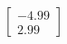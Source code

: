 \documentclass[preview]{standalone}
\begin{document}
\begin{align*}
\begin{bmatrix} -4.99 \\ 2.99 \end{bmatrix}
\end{align*}
\end{document}
